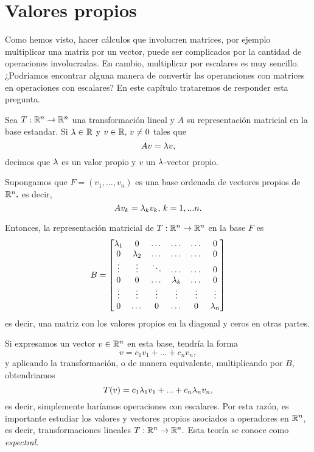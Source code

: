 \section{Valores propios}


Como hemos visto, hacer cálculos que involucren matrices, por ejemplo multiplicar una matriz por un vector, puede ser
complicados por la cantidad de operaciones involucradas. En cambio, multiplicar por escalares es muy sencillo.
¿Podríamos encontrar alguna manera de convertir las operanciones con matrices en operaciones con escalares? En este
capítulo trataremos de responder esta pregunta.

\begin{definicion}
 Sea $T:\mathbb{R}^{n}\to \mathbb{R}^{n}$ una transformación lineal y $A$ su representación matricial en la base estandar. Si $\lambda\in
\mathbb{R}$ y $v\in \mathbb{R}, \, v\neq 0$ tales que
$$
Av=\lambda v,
$$
decimos que $\lambda$ es un valor propio y $v$ un $\lambda$-vector propio.
\end{definicion}

Supongamos que $F=\left( v_{1},...,v_{n} \right)$ es una base ordenada de vectores propios de $\mathbb{R}^{n},$ es decir,
$$
Av_{k}=\lambda_{k}v_{k}, \, k=1,...n.
$$

Entonces, la representación matricial de $T:\mathbb{R}^{n}\to \mathbb{R}^{n}$ en la base $F$ es
$$
B=\begin{bmatrix}
 \lambda_{1} & 0 & \dots & \dots & \dots & 0 \\
 0 & \lambda_{2} & \dots & \dots & \dots & 0 \\
 \vdots & \vdots & \ddots & \dots & \dots & 0 \\
 0 & 0 & \dots & \lambda_{k} & \dots & 0 \\
 \vdots & \vdots &\vdots &\vdots &\vdots &\vdots \\
 0 & \dots & 0 & \dots & 0 & \lambda_{n}
\end{bmatrix}
$$
es decir, una matriz con los valores propios en la diagonal y ceros en otras partes.

Si expresamos un vector $v\in \mathbb{R}^{n}$ en esta base, tendría la forma
$$
v=c_{1}v_{1}+...+c_{n}v_{n},
$$
y aplicando la transformación, o de manera equivalente, multiplicando por $B$, obtendriamos
$$
T(v)=c_{1}\lambda_{1}v_{1}+...+c_{n}\lambda_{n}v_{n},
$$
es decir, simplemente haríamos operaciones con escalares. Por esta razón, es importante estudiar los valores y vectores
propios asociados a operadores en $\mathbb{R}^{n}$, es decir, transformaciones lineales $T:\mathbb{R}^{n}\to \mathbb{R}^{n}.$ Esta teoría se
conoce como \emph{espectral.}

